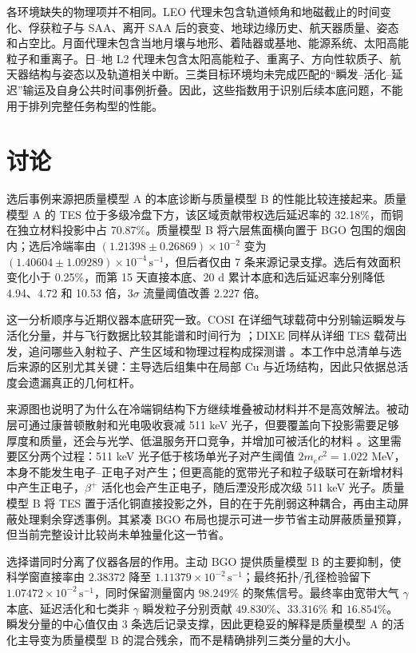 \documentclass[11pt]{article}
\newcommand{\revblue}[1]{\textcolor{revisionblue}{#1}}
\newcommand{\cps}{\,\mathrm{s^{-1}}}
\begin{document}
各环境缺失的物理项并不相同。LEO 代理未包含轨道倾角和地磁截止的时间变化、俘获粒子与 SAA、离开 SAA 后的衰变、地球边缘历史、航天器质量、姿态和占空比。月面代理未包含当地月壤与地形、着陆器或基地、能源系统、太阳高能粒子和重离子。日--地 L2 代理未包含太阳高能粒子、重离子、方向性软质子、航天器结构与姿态以及轨道相关中断。三类目标环境均未完成匹配的“瞬发--活化--延迟”输运及自身公共时间事例折叠。因此，这些指数用于识别后续本底问题，不能用于排列完整任务构型的性能。

\FloatBarrier

\section{讨论}
\label{sec:discussion}

选后事例来源把质量模型 A 的本底诊断与质量模型 B 的性能比较连接起来。质量模型 A 的 TES 位于多级冷盘下方，该区域贡献带权选后延迟率的 32.18\%，而铜在独立材料投影中占 70.87\%。质量模型 B 将六层焦面横向置于 BGO 包围的烟囱内；选后冷端率由 $(1.21398\pm0.26869)\times10^{-2}$ 变为 $(1.40604\pm1.09289)\times10^{-4}\cps$，但后者仅由 7 条来源记录支撑。选后有效面积变化小于 0.25\%，而第 15 天直接本底、20 d 累计本底和选后延迟率分别降低 4.94、4.72 和 10.53 倍，$3\sigma$ 流量阈值改善 2.227 倍。

这一分析顺序与近期仪器本底研究一致。COSI 在详细气球载荷中分别输运瞬发与活化分量，并与飞行数据比较其能谱和时间行为 \cite{Gallego2025Balloon}；DIXE 同样从详细 TES 载荷出发，追问哪些入射粒子、产生区域和物理过程构成探测谱 \cite{Tian2026DIXE}。本工作中总清单与选后来源的区别尤其关键：主导选后组集中在局部 Cu 与近场结构，因此只依据总活度会遗漏真正的几何杠杆。

来源图也说明了为什么在冷端铜结构下方继续堆叠被动材料并不是高效解法。被动层可通过康普顿散射和光电吸收衰减 511 keV 光子，但要覆盖向下投影需要足够厚度和质量，还会与光学、低温服务开口竞争，并增加可被活化的材料 \cite{NISTXCOM}。这里需要区分两个过程：511 keV 光子低于核场单光子对产生阈值 $2m_ec^2=1.022$ MeV，本身不能发生电子--正电子对产生；但更高能的宽带光子和粒子级联可在新增材料中产生正电子，$\beta^+$ 活化也会产生正电子，随后湮没形成次级 511 keV 光子。质量模型 B 将 TES 置于活化铜直接投影之外，目的在于先削弱这种耦合，再由主动屏蔽处理剩余穿透事例。其紧凑 BGO 布局也提示可进一步节省主动屏蔽质量预算，但当前完整设计比较尚未单独量化这一节省。

选择谱同时分离了仪器各层的作用。主动 BGO 提供质量模型 B 的主要抑制，使科学窗直接率由 $2.38372$ 降至 $1.11379\times10^{-2}\cps$；最终拓扑/孔径检验留下 $1.07472\times10^{-2}\cps$，同时保留测量窗内 $98.249\%$ 的聚焦信号。最终率由宽带大气 $\gamma$ 本底、延迟活化和\revblue{七类非 $\gamma$ 瞬发粒子}分别贡献 $49.830\%$、$33.316\%$ 和 $16.854\%$。瞬发分量的中心值仅由 3 条选后记录支撑，因此更稳妥的解释是质量模型 A 的活化主导变为质量模型 B 的混合残余，而不是精确排列三类分量的大小。
\end{document}
